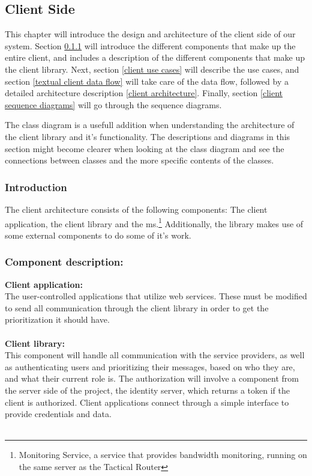 \subsection{Client Side}\label{client side}

This chapter will introduce the design and architecture of the client side of our system. Section \ref{client introduction} will introduce the different components that make up the entire client, and includes a description of the different components that make up the client library. Next, section \ref{client use cases} will describe the use cases, and section \ref{textual client data flow} will take care of the data flow, followed by a detailed architecture description \ref{client architecture}. Finally, section \ref{client sequence diagrams} will go through the sequence diagrams.
    
    The class diagram is a usefull addition when understanding the architecture of the client library and it's functionality. The descriptions and diagrams in this section might become clearer when looking at the class diagram and see the connections between classes and the more specific contents of the classes. 
		
    \subsubsection{Introduction}\label{client introduction}
The client architecture consists of the following components: The client application, the client library and the \gls{ms}.\footnote{Monitoring Service, a service that provides bandwidth monitoring, running on the same server as the Tactical Router} Additionally, the library makes use of some external components to do some of it's work.

    \subsubsection{Component description:}\label{Component description}

\indent \indent \textbf{Client application:}\\
	The user-controlled applications that utilize web services. These must be modified to send all communication through the client library in order to get the prioritization it should have.
\\\\

\indent \textbf{Client library:}\\
This component will handle all communication with the service providers, as well as authenticating users and prioritizing their messages, based on who they are, and what their current role is. The authorization will involve a component from the server side of the project, the identity server, which returns a token if the client is authorized. Client applications connect through a simple interface to provide credentials and data.
\\\\

